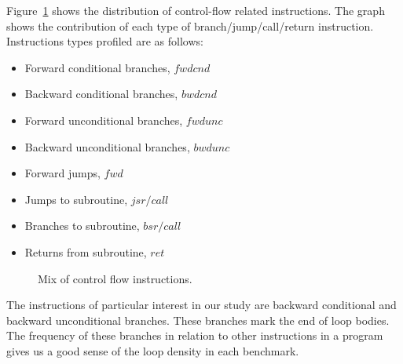 \documentclass[times,10pt,twocolumn]{article}
\newcommand{\vs}{\vspace}
\begin{document}


Figure~\ref{fig:fig2} shows the distribution of control-flow related instructions. 
The graph shows the contribution of each type of branch/jump/call/return instruction.
Instructions types profiled are as follows:

\begin{itemize}
\item{Forward conditional branches, $fwdcnd$}
\item{Backward conditional branches, $bwdcnd$}
\item{Forward unconditional branches, $fwdunc$}
\item{Backward unconditional branches, $bwdunc$}
\item{Forward jumps, $fwd$}
\item{Jumps to subroutine, $jsr/call$}
\item{Branches to subroutine, $bsr/call$}
\item{Returns from subroutine, $ret$}
\end{itemize}   


\begin{figure}
\vspace{0.2 in}
\setlength{\epsfxsize}{9.5cm}%
\centerline{}
\caption{Mix of control flow instructions.}
\label{fig:fig2}
\end{figure}

The instructions of particular interest in our study are backward 
conditional and backward unconditional branches. 
These branches mark the end of loop bodies.
The frequency of these branches in relation to other instructions in
a program gives us a good sense of the loop density in each benchmark.
\end{document}
